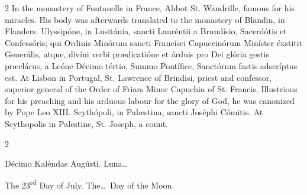 \begin{paracol}{2}
In the monastery of Fontanelle in 
 France, Abbot St. Wandrille, famous for his miracles. His body was 
 afterwards translated to the monastery of Blandin, in Flanders.
\switchcolumn*
{}
Ulyssipóne, in 
 Lusitánia, sancti Lauréntii a Brundísio, Sacerdótis et Confessóris; qui 
 Ordinis Minórum sancti Francísci Capuccinórum Miníster éxstitit Generális, 
 atque, divíni verbi prædicatióne et árduis pro Dei glória gestis præclárus, 
 a Leóne Décimo tértio, Summo Pontífice, Sanctórum fastis adscríptus est.
\switchcolumn
{}
At Lisbon in Portugal, St. Lawrence 
 of Brindisi, priest and confessor, superior general of the Order of Friars 
 Minor Capuchin of St. Francis. Illustrious for his preaching and his 
 arduous labour for the glory of God, he was canonized by Pope Leo XIII.
\switchcolumn*
{}
Scythópoli, in 
 Palæstina, sancti Joséphi Cómitis.
\switchcolumn
{}
At Scythopolis in Palestine, St. 
 Joseph, a count.
\switchcolumn*
{}
\end{paracol}


\begin{paracol}{2}
\begin{center}{\color{gregoriocolor} Décimo Kaléndas Augústi. 
 Luna\dots\ }\end{center}
\switchcolumn
{}
\begin{center}{\color{gregoriocolor} The 
 23\textsuperscript{rd} Day of 
 July. The\dots\ Day of the Moon.}\end{center}
\end{paracol}

